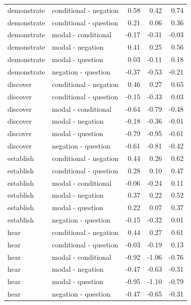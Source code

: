 \documentclass[a4paper,12pt,twoside]{article}
\begin{document}
\begin{longtable}{llrrr}
      demonstrate & conditional - negation & 0.58 & 0.42 & 0.74 \\ 
      demonstrate & conditional - question & 0.21 & 0.06 & 0.36 \\ 
      demonstrate & modal - conditional & -0.17 & -0.31 & -0.03 \\ 
      demonstrate & modal - negation & 0.41 & 0.25 & 0.56 \\ 
      demonstrate & modal - question & 0.03 & -0.11 & 0.18 \\ 
      demonstrate & negation - question & -0.37 & -0.53 & -0.21 \\ \midrule

      discover & conditional - negation & 0.46 & 0.27 & 0.65 \\ 
      discover & conditional - question & -0.15 & -0.33 & 0.03 \\ 
      discover & modal - conditional & -0.64 & -0.79 & -0.48 \\ 
      discover & modal - negation & -0.18 & -0.36 & -0.01 \\ 
      discover & modal - question & -0.79 & -0.95 & -0.61 \\ 
      discover & negation - question & -0.61 & -0.81 & -0.42 \\ \midrule

      establish & conditional - negation & 0.44 & 0.26 & 0.62 \\ 
      establish & conditional - question & 0.28 & 0.10 & 0.47 \\ 
      establish & modal - conditional & -0.06 & -0.24 & 0.11 \\ 
      establish & modal - negation & 0.37 & 0.22 & 0.52 \\ 
      establish & modal - question & 0.22 & 0.07 & 0.37 \\ 
      establish & negation - question & -0.15 & -0.32 & 0.01 \\ \midrule

      hear & conditional - negation & 0.44 & 0.27 & 0.61 \\ 
      hear & conditional - question & -0.03 & -0.19 & 0.13 \\ 
      hear & modal - conditional & -0.92 & -1.06 & -0.76 \\ 
      hear & modal - negation & -0.47 & -0.63 & -0.31 \\ 
      hear & modal - question & -0.95 & -1.10 & -0.79 \\ 
      hear & negation - question & -0.47 & -0.65 & -0.31 \\ \midrule


\end{longtable}
\end{document}
